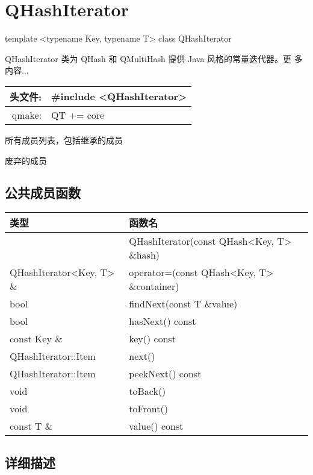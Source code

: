 \chapter{QHashIterator}

template <typename Key, typename T> class QHashIterator

QHashIterator 类为 QHash 和 QMultiHash 提供 Java 风格的常量迭代器。更
多内容...

\begin{tabular}{|r|l|}
	\hline
头文件: &	\#include <QHashIterator>\\
\hline
qmake: &	QT += core\\
	\hline
\end{tabular}

\begin{compactitem}[\arr]
\item 所有成员列表，包括继承的成员
\item 废弃的成员
\end{compactitem}

\splitLine

\section{公共成员函数}

\begin{tabular}{|l|l|}
\hline
类型	&函数名\\
\hline
 	& QHashIterator(const QHash<Key, T> \&hash)\\
\hline
QHashIterator<Key, T> \& &	operator=(const QHash<Key, T> \&container)\\
\hline
bool &	findNext(const T \&value)\\
\hline
bool &	hasNext() const\\
\hline
const Key \& &	key() const\\
\hline
QHashIterator::Item &	next()\\
\hline
QHashIterator::Item &	peekNext() const\\
\hline
void &	toBack()\\
\hline
void &	toFront()\\
\hline
const T \& 	&value() const\\
\hline
\end{tabular}

\splitLine

\section{详细描述}

